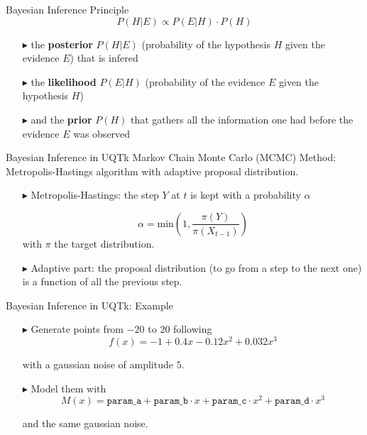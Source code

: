 \documentclass[10pt]{beamer}
\begin{document}
\begin{frame}{Bayesian Inference Principle}
	\Large
	$$P(H|E) \propto P(E|H) \cdot P(H)$$ \newline

	\large
	\begin{itemize}
  		\item[$\blacktriangleright$] the \textbf{posterior} $P(H|E)$ (probability of
  		the hypothesis $H$ given the evidence $E$) that is infered
  		\item[$\blacktriangleright$] the \textbf{likelihood} $P(E|H)$ (probability
  		of the evidence $E$ given the hypothesis $H$)
  		\item[$\blacktriangleright$] and the \textbf{prior} $P(H)$ that gathers all
  		the information one had before the evidence $E$ was observed
	\end{itemize}
	
\end{frame}

\begin{frame}{Bayesian Inference in UQTk}
	\large
	Markov Chain Monte Carlo (MCMC) Method: Metropolis-Hastings algorithm with
	adaptive proposal distribution. \newline
    \begin{itemize}
    	\item[$\blacktriangleright$] Metropolis-Hastings: the step $Y$ at $t$ is
    	kept with a probability $\alpha$
    	
    	$$\alpha = \text{min}(1, \frac{\pi (Y)}{\pi (X_{t-1})})$$
    	with $\pi$ the target distribution. \newline
    	
    	\item[$\blacktriangleright$] Adaptive part: the proposal distribution (to go from a step
    to the next one) is a function of all the previous step.
    \end{itemize}
\end{frame}

\begin{frame}{Bayesian Inference in UQTk: Example}
	\large
    \begin{itemize}
    	\item[$\blacktriangleright$] Generate points from $-20$ to $20$ following
    	$$f(x) = -1 + 0.4 x - 0.12 x^2 + 0.032 x^3$$
    	
    	with a gaussian noise of amplitude $5$. \newline
    	
    	\item[$\blacktriangleright$] Model them with
    	$$M(x) = \texttt{param\_a} + \texttt{param\_b} \cdot x + \texttt{param\_c}
    	\cdot x^2 + \texttt{param\_d} \cdot x^3$$
    	
    	and the same gaussian noise.
    \end{itemize}
\end{frame}
\end{document}
